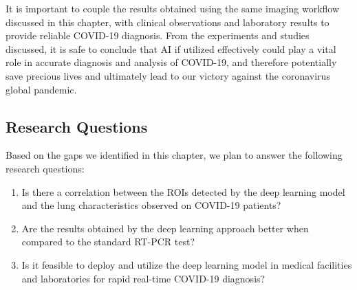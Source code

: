 
It is important to couple the results obtained 
using the same imaging workflow discussed in this chapter, with clinical 
observations and laboratory results to provide reliable COVID-19 diagnosis.
From the experiments and studies discussed, it is safe to conclude 
that AI if utilized effectively could play a vital role in 
accurate diagnosis and analysis of COVID-19, and therefore potentially 
save precious lives and ultimately lead to our victory against the coronavirus
global pandemic.
\vspace{-1em}
\subsection*{Research Questions}
Based on the gaps we identified in this chapter, we plan to answer the following research questions:

\begin{enumerate}
  \item Is there a correlation between the ROIs detected by the deep learning model and the lung characteristics observed on COVID-19 patients?
  \item Are the results obtained by the deep learning approach better when compared to the standard RT-PCR test?
  \item Is it feasible to deploy and utilize the deep learning model in medical facilities and laboratories for rapid real-time COVID-19 diagnosis?
\end{enumerate}